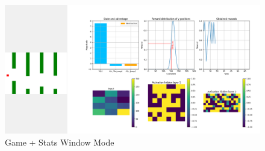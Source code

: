 \begin{figure}
    \centering
    \includegraphics[width=\textwidth]{media/Screenshot-stats-window.png}
    \caption{Game + Stats Window Mode}
    \label{fig:stats-window}
\end{figure}
